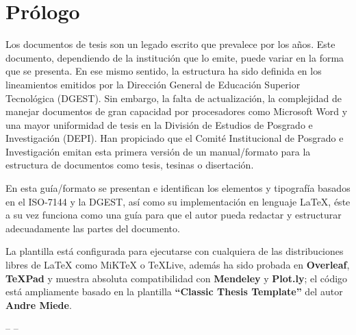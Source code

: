 \chapter*{Prólogo}

Los documentos de tesis son un legado escrito que prevalece por los años. Este documento, dependiendo de la institución que lo emite, puede variar en la forma que se presenta. En ese mismo sentido, la estructura ha sido definida en los lineamientos emitidos por la Dirección General de Educación Superior Tecnológica (DGEST). Sin embargo, la falta de actualización, la complejidad de manejar documentos de gran capacidad por procesadores como Microsoft Word y una mayor uniformidad de tesis en la División de Estudios de Posgrado e Investigación (DEPI). Han propiciado que el Comité Institucional de Posgrado e Investigación emitan esta primera versión de un manual/formato para la estructura de documentos como tesis, tesinas o disertación.\par 

En esta guía/formato se presentan e identifican los elementos y tipografía basados en el ISO-7144 y la DGEST, así como su implementación en lenguaje \LaTeX, éste a su vez funciona como una guía para que el autor pueda redactar y estructurar adecuadamente las partes del documento.\par

La plantilla está configurada para ejecutarse con cualquiera de las distribuciones libres de \LaTeX{} como MiK\TeX{} o \TeX Live, además ha sido probada en \textbf{Overleaf}, \textbf{\TeX Pad} y muestra absoluta compatibilidad con \textbf{Mendeley} y \textbf{Plot.ly}; el código está ampliamente basado en la plantilla \textbf{``Classic Thesis Template''} del autor \textbf{Andre Miede}.\par 

\bigskip
\begin{flushright}
-- \myProf --	
\end{flushright}